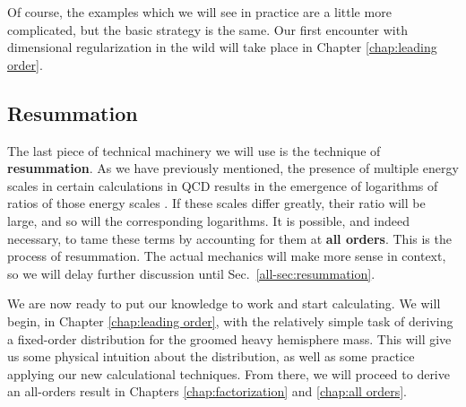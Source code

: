 \documentclass[../thesis.tex]{subfiles}
\begin{document}
	Of course, the examples which we will see in practice are a little more complicated, but the basic strategy is the same. Our first encounter with dimensional regularization in the wild will take place in Chapter \ref{chap:leading order}.

\subsection{Resummation}
	The last piece of technical machinery we will use is the technique of \textbf{resummation}. As we have previously mentioned, the presence of multiple energy scales in certain calculations in QCD results in the emergence of logarithms of ratios of those energy scales \cite{larkoski_elementary_2019-1,becher_introduction_2015-1}. If these scales differ greatly, their ratio will be large, and so will the corresponding logarithms. It is possible, and indeed necessary, to tame these terms by accounting for them at \textbf{all orders}. This is the process of resummation. The actual mechanics will make more sense in context, so we will delay further discussion until Sec.~\ref{all-sec:resummation}.

	We are now ready to put our knowledge to work and start calculating. We will begin, in Chapter \ref{chap:leading order}, with the relatively simple task of deriving a fixed-order distribution for the groomed heavy hemisphere mass. This will give us some physical intuition about the distribution, as well as some practice applying our new calculational techniques. From there, we will proceed to derive an all-orders result in Chapters \ref{chap:factorization} and \ref{chap:all orders}.
\end{document}
